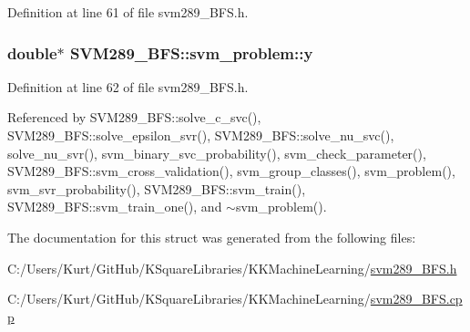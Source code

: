 Definition at line 61 of file svm289\+\_\+\+B\+F\+S.\+h.

\subsubsection[{\texorpdfstring{y}{y}}]{\setlength{\rightskip}{0pt plus 5cm}double$\ast$ S\+V\+M289\+\_\+\+B\+F\+S\+::svm\+\_\+problem\+::y}\hypertarget{struct_s_v_m289___b_f_s_1_1svm__problem_a6a79c81e0e6251913062a811c87d9325}{}\label{struct_s_v_m289___b_f_s_1_1svm__problem_a6a79c81e0e6251913062a811c87d9325}


Definition at line 62 of file svm289\+\_\+\+B\+F\+S.\+h.



Referenced by S\+V\+M289\+\_\+\+B\+F\+S\+::solve\+\_\+c\+\_\+svc(), S\+V\+M289\+\_\+\+B\+F\+S\+::solve\+\_\+epsilon\+\_\+svr(), S\+V\+M289\+\_\+\+B\+F\+S\+::solve\+\_\+nu\+\_\+svc(), solve\+\_\+nu\+\_\+svr(), svm\+\_\+binary\+\_\+svc\+\_\+probability(), svm\+\_\+check\+\_\+parameter(), S\+V\+M289\+\_\+\+B\+F\+S\+::svm\+\_\+cross\+\_\+validation(), svm\+\_\+group\+\_\+classes(), svm\+\_\+problem(), svm\+\_\+svr\+\_\+probability(), S\+V\+M289\+\_\+\+B\+F\+S\+::svm\+\_\+train(), S\+V\+M289\+\_\+\+B\+F\+S\+::svm\+\_\+train\+\_\+one(), and $\sim$svm\+\_\+problem().



The documentation for this struct was generated from the following files\+:\begin{DoxyCompactItemize}
\item 
C\+:/\+Users/\+Kurt/\+Git\+Hub/\+K\+Square\+Libraries/\+K\+K\+Machine\+Learning/\hyperlink{svm289___b_f_s_8h}{svm289\+\_\+\+B\+F\+S.\+h}\item 
C\+:/\+Users/\+Kurt/\+Git\+Hub/\+K\+Square\+Libraries/\+K\+K\+Machine\+Learning/\hyperlink{svm289___b_f_s_8cpp}{svm289\+\_\+\+B\+F\+S.\+cpp}\end{DoxyCompactItemize}
